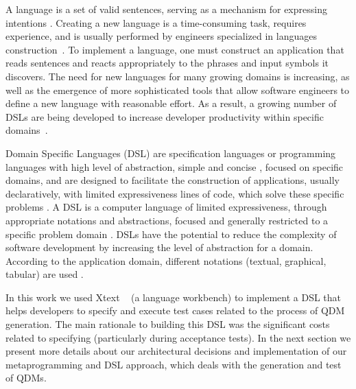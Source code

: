 A language is a set of valid sentences, serving as a mechanism for expressing intentions \cite{parr2010}. 
Creating a new language is a time-consuming task, requires experience, and is usually performed by engineers specialized 
in languages construction~\cite{karsai2014}. To implement a language, one must construct an application that reads sentences and reacts 
appropriately to the phrases and input symbols it discovers.
The need for new languages for many growing domains is increasing, as well as the emergence of more sophisticated 
tools that allow software engineers to define a new language with reasonable effort. As a result, a growing number of DSLs 
are being developed to increase developer productivity within specific domains~\cite{karsai2014}. 


Domain Specific Languages (DSL) are specification languages or programming languages with high level of abstraction, 
simple and concise \cite{raja2010}, focused on specific domains, and are designed to facilitate the construction of applications, 
usually declaratively, with limited expressiveness lines of code, which solve these specific problems \cite{neeraj2017}. 
A DSL is a computer language of limited expressiveness, through appropriate notations and abstractions, focused and generally 
restricted to a specific problem domain \cite{fowler2013,vanDeursen2000}. DSLs have the 
potential to reduce the complexity of software development by increasing the level of abstraction for a domain. 
According to the application domain, different notations (textual, graphical, tabular) are used \cite{pfeiffer2008}.


In this work we used Xtext ~\cite{eysholdt2010} (a language workbench) to implement a DSL that helps
developers to specify and execute test cases related to the process of QDM generation.
The main rationale to building this DSL was the significant costs related to specifying \callers
(particularly during acceptance tests). In the next section we present more details about
our architectural decisions and implementation of our metaprogramming and DSL approach,
which deals with the generation and test of QDMs. 

